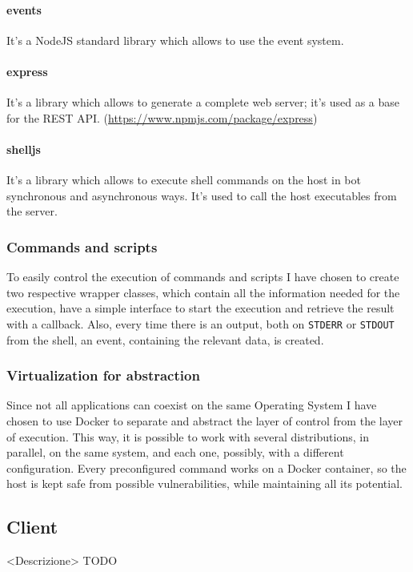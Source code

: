 \documentclass[../PiTest.tex]{subfiles}
\begin{document}
    \paragraph{events}
    It's a NodeJS standard library which allows to use the event system.

    \paragraph{express}
    It's a \npm library which allows to generate a complete web server; it's used as a base for the REST API. (\url{https://www.npmjs.com/package/express})

    \paragraph{shelljs}
    It's a \npm library which allows to execute shell commands on the host in bot synchronous and asynchronous ways. It's used to call the host executables from the server.
    

    \subsubsection{Commands and scripts}
    To easily control the execution of commands and scripts I have chosen to create two respective wrapper classes, which contain all the information needed for the execution, have a simple interface to start the execution and retrieve the result with a callback. Also, every time there is an output, both on \texttt{STDERR} or \texttt{STDOUT} from the shell, an event, containing the relevant data, is created.

    \subsubsection{Virtualization for abstraction}
    Since not all applications can coexist on the same Operating System I have chosen to use Docker to separate and abstract the layer of control from the layer of execution. This way, it is possible to work with several distributions, in parallel, on the same system, and each one, possibly, with a different configuration.
    Every preconfigured command works on a Docker container, so the host is kept safe from possible vulnerabilities, while maintaining all its potential.

    \subsection{Client}
    <Descrizione> TODO
\end{document}
